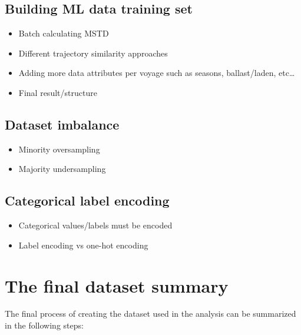\subsection{Building ML data training set}

\begin{itemize}
    \item Batch calculating MSTD
    \item Different trajectory similarity approaches
    \item Adding more data attributes per voyage such as seasons, ballast/laden, etc\ldots
    \item Final result/structure
\end{itemize}

\subsection{Dataset imbalance}

\begin{itemize}
    \item Minority oversampling
    \item Majority undersampling
\end{itemize}

\subsection{Categorical label encoding}

\begin{itemize}
    \item Categorical values/labels must be encoded
    \item Label encoding vs one-hot encoding
\end{itemize}

\section{The final dataset summary}

The final process of creating the dataset used in the analysis can be summarized in the following steps:

